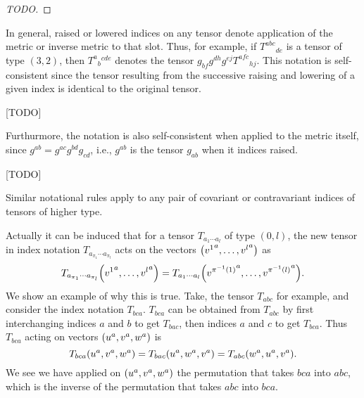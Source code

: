 \documentclass{note}
\numberwithin{equation}{chapter}
\begin{document}
\begin{proof}
    [TODO]
\end{proof}

\begin{quotebox}
    In general, raised or lowered indices on any tensor denote application of the
    metric or inverse metric to that slot. Thus, for example, if $T^{abc}{}_{de}$
    is a tensor of type $(3,2)$, then $T^a{}_b{}^{cde}$ denotes the tensor
    $g_{bf}g^{dh}g^{ej}T^{afc}{}_{hj}$. This notation is self-consistent since the
    tensor resulting from the successive raising and lowering of a given index is
    identical to the original tensor.
\end{quotebox}

[TODO]

\begin{quotebox}
    Furthurmore, the notation is also self-consistent when applied to the metric
    itself, since $g^{ab} = g^{ac}g^{bd}g_{cd}$, i.e., $g^{ab}$ is the tensor
    $g_{ab}$ when it indices raised.
\end{quotebox}

[TODO]

\begin{quotebox}
    Similar notational rules apply to any pair of covariant or contravariant
    indices of tensors of higher type.
\end{quotebox}

Actually it can be induced that for a tensor $T_{a_1\cdots a_l}$ of type $(0,
    l)$, the new tensor in index notation $T_{a_{\pi_1}\cdots a_{\pi_l}}$ acts on
the vectors $\prn{{v^1}^a, \dots, {v^l}^a}$ as
\begin{equation*}
    T_{a_{\pi_1}\cdots a_{\pi_l}} \prn{{v^1}^a, \dots, {v^l}^a} = T_{a_1\cdots a_l}
    \prn{{v^{\pi^{-1}(1)}}^a, \dots, {v^{\pi^{-1}(l)}}^a}.
\end{equation*}
We show an example of why this is true. Take, the tensor $T_{abc}$ for example,
and consider the index notation $T_{bca}$. $T_{bca}$ can be obtained from
$T_{abc}$ by first interchanging indices $a$ and $b$ to get $T_{bac}$, then
indices $a$ and $c$ to get $T_{bca}$. Thus $T_{bca}$ acting on vectors
$\prn{u^a, v^a, w^a}$ is
\begin{equation*}
    T_{bca} \prn{u^a, v^a, w^a} = T_{bac} \prn{u^a, w^a, v^a} = T_{abc} \prn{w^a,
        u^a, v^a}.
\end{equation*}
We see we have applied on $\prn{u^a, v^a, w^a}$ the permutation that takes
$bca$ into $abc$, which is the inverse of the permutation that takes $abc$ into
$bca$.
\end{document}

